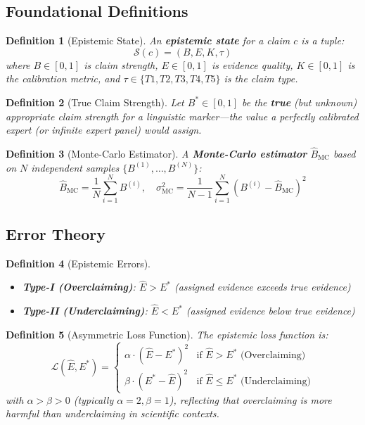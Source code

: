 \documentclass[11pt,a4paper]{article}
\newtheorem{definition}{Definition}[section]
\begin{document}
\subsection{Foundational Definitions}

\begin{definition}[Epistemic State]
An \textbf{epistemic state} for a claim $c$ is a tuple:
\[
\mathcal{S}(c) = (B, E, K, \tau)
\]
where $B \in [0,1]$ is claim strength, $E \in [0,1]$ is evidence quality, $K \in [0,1]$ is the calibration metric, and $\tau \in \{T1, T2, T3, T4, T5\}$ is the claim type.
\end{definition}

\begin{definition}[True Claim Strength]
Let $B^* \in [0,1]$ be the \textbf{true} (but unknown) appropriate claim strength for a linguistic marker---the value a perfectly calibrated expert (or infinite expert panel) would assign.
\end{definition}

\begin{definition}[Monte-Carlo Estimator]
A \textbf{Monte-Carlo estimator} $\hat{B}_{\mathrm{MC}}$ based on $N$ independent samples $\{B^{(1)}, \ldots, B^{(N)}\}$:
\[
\hat{B}_{\mathrm{MC}} = \frac{1}{N} \sum_{i=1}^{N} B^{(i)}, \quad \sigma_{\mathrm{MC}}^2 = \frac{1}{N-1} \sum_{i=1}^{N} (B^{(i)} - \hat{B}_{\mathrm{MC}})^2
\]
\end{definition}

\subsection{Error Theory}

\begin{definition}[Epistemic Errors]
\begin{itemize}
    \item \textbf{Type-I (Overclaiming)}: $\hat{E} > E^*$ (assigned evidence exceeds true evidence)
    \item \textbf{Type-II (Underclaiming)}: $\hat{E} < E^*$ (assigned evidence below true evidence)
\end{itemize}
\end{definition}

\begin{definition}[Asymmetric Loss Function]
The epistemic loss function is:
\[
\mathcal{L}(\hat{E}, E^*) =
\begin{cases}
\alpha \cdot (\hat{E} - E^*)^2 & \text{if } \hat{E} > E^* \text{ (Overclaiming)} \\
\beta \cdot (E^* - \hat{E})^2 & \text{if } \hat{E} \leq E^* \text{ (Underclaiming)}
\end{cases}
\]
with $\alpha > \beta > 0$ (typically $\alpha = 2, \beta = 1$), reflecting that overclaiming is more harmful than underclaiming in scientific contexts.
\end{definition}
\end{document}
